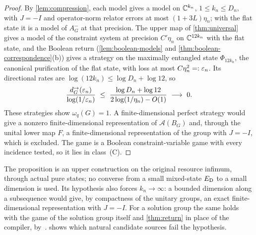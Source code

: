 \begin{proof}
By \cref{lem:compression}, each model gives a model on $\mathbb C^{k_n}$, $1\le k_n\le D_n$, with $J=-I$ and operator-norm relator errors at
most $(1+3L)\eta_n$; with the flat state it is a model of $A^-_G$ at that precision. The upper map of \cref{thm:universal} gives a
model of the constraint system at precision $C'\eta_n$ on $\mathbb C^{12k_n}$ with the flat state, and the Boolean return
(\cref{lem:boolean-models} and \cref{thm:boolean-correspondence}(b)) gives a strategy on the maximally entangled state
$\Phi_{12k_n}$, the canonical purification of the flat state, with loss at most $C\eta_n^2=:\varepsilon_n$. Its directional rates are $\log(12k_n)\le\log D_n+\log12$, so
\[
\frac{d^\to_G(\eps_n)}{\log(1/\eps_n)}\ \le\ \frac{\log D_n+\log12}{2\log(1/\eta_n)-O(1)}\ \longrightarrow\ 0 .
\]
These strategies show $\omega_q(G)=1$. A finite-dimensional perfect strategy would give a nonzero finite-dimensional representation of
$\mathcal A(B_G)$ and, through the unital lower map $F$, a finite-dimensional representation of the group with $J=-I$, which is
excluded. The game is a Boolean constraint-variable game with every incidence tested, so it lies in class~(C).
\end{proof}

The proposition is an upper construction on the original resource infimum, through actual pure states; no converse from a small
mixed-state $E_{\mathrm D}$ to a small dimension is used. Its hypothesis also forces $k_n\to\infty$: a bounded dimension along a subsequence
would give, by compactness of the unitary groups, an exact finite-dimensional representation with $J=-I$. For a solution group the
same holds with the game of the solution group itself and \cref{thm:return} in place of the compiler, by~\cite[Proposition~4.4(a)]{SV18}.
 shows which natural candidate sources fail the hypothesis.
